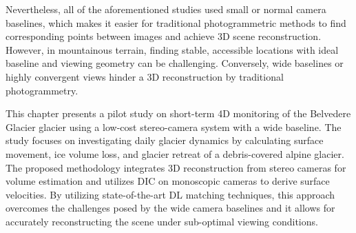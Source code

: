 Nevertheless, all of the aforementioned studies used small or normal camera baselines,
which makes it easier for traditional photogrammetric methods to find corresponding
points between images and achieve 3D scene reconstruction.
However, in mountainous terrain, finding stable, accessible locations with ideal
baseline and viewing geometry can be challenging.
Conversely, wide baselines or highly convergent views hinder a 3D reconstruction by
traditional photogrammetry.



This chapter presents a pilot study on short-term 4D monitoring of the Belvedere Glacier glacier using a low-cost stereo-camera system with a wide baseline. 
The study focuses on investigating daily glacier dynamics by calculating surface movement, ice volume loss, and glacier retreat of a debris-covered alpine glacier.
The proposed methodology integrates 3D reconstruction from stereo cameras for volume
estimation and utilizes DIC on monoscopic cameras to derive surface velocities.
By utilizing state-of-the-art DL matching techniques, this approach overcomes
the challenges posed by the wide camera baselines and it allows for accurately
reconstructing the scene under sub-optimal viewing conditions.

